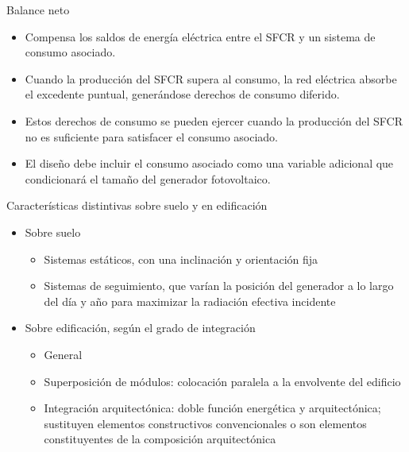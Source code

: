 \documentclass[xcolor={usenames,svgnames,dvipsnames}]{beamer}
\begin{document}
\begin{frame}[label=sec-1-0-4]{Balance neto}
\begin{itemize}
\item Compensa los saldos de energía eléctrica entre el SFCR y un sistema
de consumo asociado.

\item Cuando la producción del SFCR supera al consumo, la red eléctrica
absorbe el excedente puntual, generándose derechos de consumo
diferido.

\item Estos derechos de consumo se pueden ejercer cuando la producción del
SFCR no es suficiente para satisfacer el consumo asociado.

\item El diseño debe incluir el consumo asociado como una variable
adicional que condicionará el tamaño del generador fotovoltaico.
\end{itemize}
\end{frame}

\begin{frame}[label=sec-1-0-5]{Características distintivas sobre suelo y en edificación}
\begin{itemize}
\item \alert{Sobre suelo}

\begin{itemize}
\item Sistemas estáticos, con una inclinación y orientación fija

\item Sistemas de seguimiento, que varían la posición del generador a lo
largo del día y año para maximizar la radiación efectiva incidente
\end{itemize}

\item \alert{Sobre edificación}, según el grado de integración

\begin{itemize}
\item General

\item Superposición de módulos: colocación paralela a la envolvente del
edificio

\item Integración arquitectónica: doble función energética y
arquitectónica; sustituyen elementos constructivos convencionales
o son elementos constituyentes de la composición arquitectónica
\end{itemize}
\end{itemize}
\end{frame}
\end{document}

